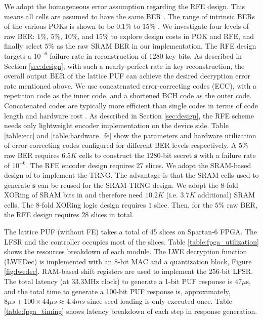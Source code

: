 We adopt the homogeneous error assumption regarding the RFE design. This means all cells are assumed to have the same BER \cite{bosch2008efficient}.
The range of intrinsic BERs of the various POKs is shown to be $0.1\%$ \cite{karpinskyy20168} to $15\%$ \cite{maes2009soft}. 
We investigate four levels of raw BER: $1\%$, $5\%$, $10\%$, and $15\%$ to explore design costs in POK and RFE, and finally select $5\%$ as the raw SRAM BER in our implementation. The RFE design targets a $10^{-6}$ failure rate in reconstruction of $1280$ key bits. As described in Section \ref{sec:design}, with such a nearly-perfect rate in key reconstruction, the overall output BER of the lattice PUF can achieve the desired decryption error rate mentioned above.
We use concatenated error-correcting codes (ECC), with a repetition code as the inner code, and a shortened BCH code as the outer code.
Concatenated codes are typically more efficient than single codes in terms of code length and hardware cost \cite{bosch2008efficient}. 
As described in Section \ref{sec:design}, the RFE scheme needs only lightweight encoder implementation on the device side. 
Table \ref{table:ecc} and \ref{table:hardware_fe} show the parameters and hardware utilization of error-correcting codes configured for different BER levels respectively.
A $5\%$ raw BER requires $6.5K$ cells to construct the $1280$-bit secret $\mathbf{s}$ with a failure rate of $10^{-6}$.
The RFE encoder design requires $27$ slices. 
We adopt the SRAM-based design of \cite{aysu2015end} to implement the TRNG. The advantage is that the SRAM cells used to generate $\mathbf{s}$ can be reused for the SRAM-TRNG design. 
We adopt the 8-fold XORing of SRAM bits in \cite{aysu2015end} and therefore need $10.2K$ (i.e. $3.7K$ additional) SRAM cells. 
The 8-fold XORing logic design requires $1$ slice. 
Then, for the $5\%$ raw BER, the RFE design requires $28$ slices in total. 

The lattice PUF (without FE) takes a total of 45 slices on Spartan-6 FPGA. The LFSR and the controller occupies most of the slices. Table \ref{table:fpga_utilization} shows the resources breakdown of each module. The LWE decryption function (LWEDec) is implemented with an 8-bit MAC and a quantization block, Figure \ref{fig:lwedec}.
RAM-based shift registers are used to implement the 256-bit LFSR. The total latency (at 33.3MHz clock) to generate a 1-bit PUF response is $47\mu$s, and the total time to generate a 100-bit PUF response is, approximately, $8\mu s + 100\times 44\mu s\approx 4.4ms$ since seed loading is only executed once. 
Table \ref{table:fpga_timing} shows latency breakdown of each step in response generation. 

